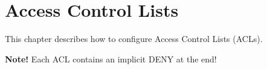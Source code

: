 \section{Access Control Lists}
This chapter describes how to configure Access Control Lists (ACLs).
\begin{tcolorbox}
\textbf{Note!} Each ACL contains an implicit DENY at the end!
\end{tcolorbox}
